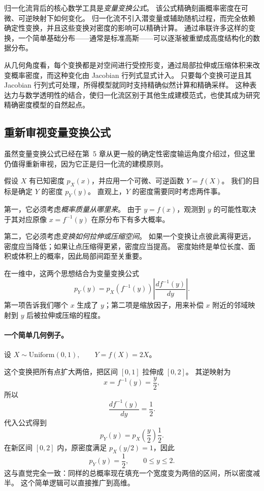 归一化流背后的核心数学工具是\emph{变量变换公式}。
该公式精确刻画概率密度在可微、可逆映射下如何变化。
归一化流不引入潜变量或辅助随机过程，而完全依赖确定性变换，并且这些变换对密度的影响可以精确计算。
通过串联许多这样的变换，一个简单基础分布——通常是标准高斯——可以逐渐被重塑成高度结构化的数据分布。

从几何角度看，每个变换都是对空间进行受控形变，通过局部拉伸或压缩体积来改变概率密度，而这种变化由 Jacobian 行列式显式计入。
只要每个变换可逆且其 Jacobian 行列式可处理，所得模型就同时支持精确似然计算和精确采样。
这种表达力与数学透明性的结合，使归一化流区别于其他生成建模范式，也使其成为研究精确密度模型的自然起点。

\subsection{重新审视变量变换公式}

虽然变量变换公式已经在第~5 章从更一般的确定性密度输运角度介绍过，但这里仍值得重新审视，因为它正是归一化流的建模原则。

假设 $X$ 有已知密度 $p_X(x)$，并应用一个可微、可逆函数
$Y=f(X)$。
我们的目标是确定 $Y$ 的密度 $p_Y(y)$。
直观上，$Y$ 的密度需要同时考虑两件事。

第一，它必须考虑\emph{概率质量从哪里来}。
由于 $y=f(x)$，观测到 $y$ 的可能性取决于其对应原像
$x=f^{-1}(y)$
在原分布下有多大概率。

第二，它必须考虑\emph{变换如何拉伸或压缩空间}。
如果一个变换让点彼此离得更远，密度应当降低；如果让点压缩得更紧，密度应当提高。
密度始终是单位长度、面积或体积上的概率，因此局部间距至关重要。

在一维中，这两个思想结合为变量变换公式
\[
\boxed{
p_Y(y)
=
p_X(f^{-1}(y))
\left|
\frac{d f^{-1}(y)}{dy}
\right|.
}
\]
第一项告诉我们哪个 $x$ 生成了 $y$；第二项是缩放因子，用来补偿 $x$ 附近的邻域映射到 $y$ 后被拉伸或压缩的程度。

\paragraph{一个简单几何例子。}

设
$X\sim \mathrm{Uniform}(0,1),
\qquad
Y=f(X)=2X$。

这个变换把所有点扩大两倍，把区间 $[0,1]$ 拉伸成 $[0,2]$。
其逆映射为
\[
x=f^{-1}(y)=\frac{y}{2},
\]
所以
\[
\frac{d f^{-1}(y)}{dy}
=
\frac{1}{2}.
\]
代入公式得到
\[
p_Y(y)
=
p_X\!\left(\frac{y}{2}\right)\frac{1}{2}.
\]
在新区间 $[0,2]$ 内，原密度满足 $p_X(y/2)=1$，因此
\[
p_Y(y)=\frac{1}{2},
\qquad 0\leq y\leq 2.
\]
这与直觉完全一致：同样的总概率现在填充一个宽度变为两倍的区间，所以密度减半。
这个简单逻辑可以直接推广到高维。

